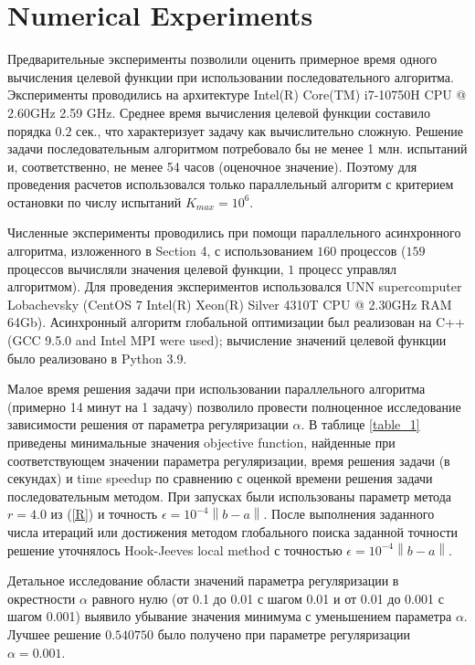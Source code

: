 \documentclass{svproc}
\begin{document}
\section{Numerical Experiments}\label{Sec_Exp}

Предварительные эксперименты позволили оценить примерное время одного вычисления целевой функции при использовании последовательного алгоритма. Эксперименты проводились на архитектуре Intel(R) Core(TM) i7-10750H CPU @ 2.60GHz 2.59 GHz. Среднее время вычисления целевой функции составило порядка $0.2$ сек., что характеризует задачу как вычислительно сложную. Решение задачи последовательным алгоритмом потребовало бы не менее 1 млн. испытаний и, соответственно, не менее 54 часов (оценочное значение).
Поэтому для проведения расчетов использовался только параллельный алгоритм с критерием остановки по числу испытаний $K_{max}=10^6$. 

Численные эксперименты проводились при помощи параллельного асинхронного алгоритма, изложенного в Section 4, с использованием $160$ процессов ($159$ процессов вычисляли значения целевой функции, $1$ процесс управлял алгоритмом). Для проведения экспериментов использовался UNN supercomputer Lobachevsky (CentOS 7 Intel(R) Xeon(R) Silver 4310T CPU @ 2.30GHz RAM 64Gb). Асинхронный алгоритм глобальной оптимизации был реализован на C++ (GCC 9.5.0 and Intel MPI were used); вычисление значений целевой функции было реализовано в Python 3.9.

Малое время решения задачи при использовании параллельного алгоритма (примерно 14 минут на 1 задачу) позволило провести полноценное исследование зависимости решения от параметра регуляризации $\alpha$. В таблице \ref{table_1} приведены минимальные значения objective function, найденные при соответствующем значении параметра регуляризации, время решения задачи (в секундах) и time speedup по сравнению с оценкой времени решения задачи последовательным методом. При запусках были использованы параметр метода $r=4.0$ из (\ref{R}) и точность $\epsilon = 10^{-4}\left\|b-a\right\|$. После выполнения заданного числа итераций или достижения методом глобального поиска заданной точности решение уточнялось Hook-Jeeves local method \cite{HookJeeves} с точностью $\epsilon = 10^{-4}\left\|b-a\right\|$.

Детальное исследование области значений параметра регуляризации в окрестности $\alpha$ равного нулю (от 0.1 до 0.01 с шагом 0.01 и от 0.01 до 0.001 с шагом 0.001) выявило убывание значения минимума с уменьшением параметра $\alpha$. Лучшее решение $0.540750$ было получено при параметре регуляризации $\alpha = 0.001$.
\end{document}
